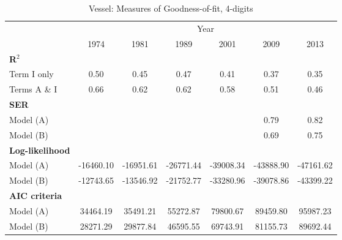 \documentclass[a4paper,11pt]{article}
\begin{document}
\begin{table}[htbp]
  \centering
  \caption{Vessel: Measures of Goodness-of-fit, 4-digits}
\begin{center}
\label{tab:good_fit_ves_rob}%
\begin{tabular}{l|cccccc}
\hline
\hline
      & \multicolumn{6}{c}{Year}                   \\
      & \multicolumn{1}{c}{1974} & \multicolumn{1}{c}{1981} & \multicolumn{1}{c}{1989} & \multicolumn{1}{c}{2001} & \multicolumn{1}{c}{2009} & \multicolumn{1}{c}{2013}  \\ \hline
\boldmath{}\textbf{R$^{2}$}\unboldmath{} &       &       &       &       &       &         \\
Term I only & 0.50  & 0.45  & \multicolumn{1}{c}{0.47} & \multicolumn{1}{c}{0.41} & \multicolumn{1}{c}{0.37} & \multicolumn{1}{c}{0.35} \\
Terms A \& I & 0.66  & 0.62  & \multicolumn{1}{c}{0.62} & \multicolumn{1}{c}{0.58} & \multicolumn{1}{c}{0.51} & \multicolumn{1}{c}{0.46} \\
\textbf{SER} &       &       & \multicolumn{1}{c}{} & \multicolumn{1}{c}{} & \multicolumn{1}{c}{} & \multicolumn{1}{c}{} \\
Model (A) &       &       & \multicolumn{1}{c}{} & \multicolumn{1}{c}{} & \multicolumn{1}{c}{0.79} & \multicolumn{1}{c}{0.82} \\
Model (B) &       &       & \multicolumn{1}{c}{} & \multicolumn{1}{c}{} & \multicolumn{1}{c}{0.69} & \multicolumn{1}{c}{0.75} \\
\textbf{Log-likelihood} &       &       & \multicolumn{1}{c}{} & \multicolumn{1}{c}{} & \multicolumn{1}{c}{} & \multicolumn{1}{c}{} \\
Model (A)& -16460.10 & -16951.61 & \multicolumn{1}{c}{-26771.44} & \multicolumn{1}{c}{-39008.34} & \multicolumn{1}{c}{-43888.90} & \multicolumn{1}{c}{-47161.62} \\
Model (B) & -12743.65 & -13546.92 & \multicolumn{1}{c}{-21752.77} & \multicolumn{1}{c}{-33280.96} & \multicolumn{1}{c}{-39078.86} & \multicolumn{1}{c}{-43399.22}  \\
\textbf{AIC criteria} &       &       & \multicolumn{1}{c}{} & \multicolumn{1}{c}{} & \multicolumn{1}{c}{} & \multicolumn{1}{c}{} \\
Model (A) & 34464.19 & 35491.21 & \multicolumn{1}{c}{55272.87} & \multicolumn{1}{c}{79800.67} & \multicolumn{1}{c}{89459.80} & \multicolumn{1}{c}{95987.23}\\
Model (B) & 28271.29 & 29877.84 & \multicolumn{1}{c}{46595.55} & \multicolumn{1}{c}{69743.91} & \multicolumn{1}{c}{81155.73} & \multicolumn{1}{c}{89692.44} \\

\end{tabular}
\end{center}
\end{table}
\end{document}
